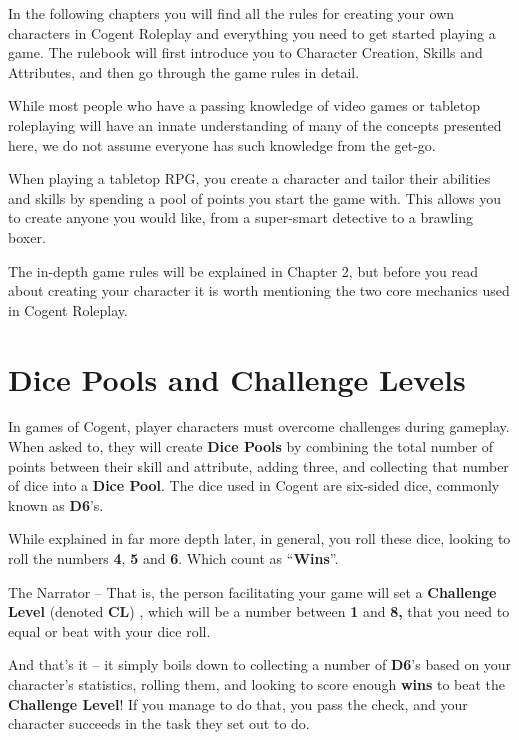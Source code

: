 In the following chapters you will find all the rules for creating your own characters in Cogent Roleplay and everything you need to get started playing a game. The rulebook will first introduce you to Character Creation, Skills and Attributes, and then go through the game rules in detail.

While most people who have a passing knowledge of video games or tabletop roleplaying will have an innate understanding of many of the concepts presented here, we do not assume everyone has such knowledge from the get-go.

When playing a tabletop RPG, you create a character and tailor their abilities and skills by spending a pool of points you start the game with. This allows you to create anyone you would like, from a super-smart detective to a brawling boxer.

The in-depth game rules will be explained in Chapter 2, but before you read about creating your character it is worth mentioning the two core mechanics used in Cogent Roleplay.

\section{Dice Pools and Challenge Levels} \label{sec:dice_pools_and_challenge_levels}

In games of Cogent, player characters must overcome challenges during gameplay. When asked to, they will create \textbf{Dice Pools} by combining the total number of points between their skill and attribute, adding three, and collecting that number of dice into a \textbf{Dice Pool}. The dice used in Cogent are six-sided dice, commonly known as \textbf{D6}’s.

While explained in far more depth later, in general, you roll these dice, looking to roll the numbers \textbf{4}, \textbf{5} and \textbf{6}. Which count as “\textbf{Wins}”.

The Narrator – That is, the person facilitating your game will set a \textbf{Challenge Level} (denoted \textbf{CL}) , which will be a number between \textbf{1} and \textbf{8,} that you need to equal or beat with your dice roll.

And that’s it – it simply boils down to collecting a number of \textbf{D6}’s based on your character's statistics, rolling them, and looking to score enough \textbf{wins} to beat the \textbf{Challenge Level}! If you manage to do that, you pass the check, and your character succeeds in the task they set out to do.